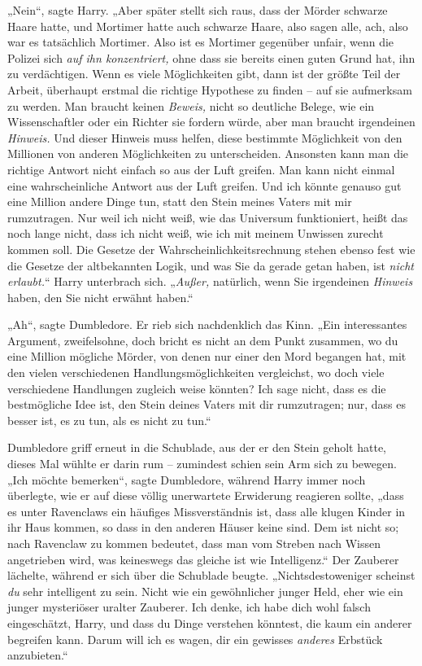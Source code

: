 {„Nein“, sagte Harry. „Aber später stellt sich raus, dass der Mörder schwarze Haare hatte, und Mortimer hatte auch schwarze Haare, also sagen alle, ach, also war es tatsächlich Mortimer. Also ist es Mortimer gegenüber unfair, wenn die Polizei sich \emph{auf ihn konzentriert,} ohne dass sie bereits einen guten Grund hat, ihn zu verdächtigen. Wenn es viele Möglichkeiten gibt, dann ist der größte Teil der Arbeit, überhaupt erstmal die richtige Hypothese zu finden -- auf sie aufmerksam zu werden. Man braucht keinen \emph{Beweis,} nicht so deutliche Belege, wie ein Wissenschaftler oder ein Richter sie fordern würde, aber man braucht irgendeinen \emph{Hinweis.} Und dieser Hinweis muss helfen, diese bestimmte Möglichkeit von den Millionen von anderen Möglichkeiten zu unterscheiden. Ansonsten kann man die richtige Antwort nicht einfach so aus der Luft greifen. Man kann nicht einmal eine wahrscheinliche Antwort aus der Luft greifen. Und ich könnte genauso gut eine Million andere Dinge tun, statt den Stein meines Vaters mit mir rumzutragen. Nur weil ich nicht weiß, wie das Universum funktioniert, heißt das noch lange nicht, dass ich nicht weiß, wie ich mit meinem Unwissen zurecht kommen soll. Die Gesetze der Wahrscheinlichkeitsrechnung stehen ebenso fest wie die Gesetze der altbekannten Logik, und was Sie da gerade getan haben, ist \emph{nicht erlaubt.}“ Harry unterbrach sich. „\emph{Außer,} natürlich, wenn Sie irgendeinen \emph{Hinweis} haben, den Sie nicht erwähnt haben.“

„Ah“, sagte Dumbledore. Er rieb sich nachdenklich das Kinn. „Ein interessantes Argument, zweifelsohne, doch bricht es nicht an dem Punkt zusammen, wo du eine Million mögliche Mörder, von denen nur einer den Mord begangen hat, mit den vielen verschiedenen Handlungsmöglichkeiten vergleichst, wo doch viele verschiedene Handlungen zugleich weise könnten? Ich sage nicht, dass es die bestmögliche Idee ist, den Stein deines Vaters mit dir rumzutragen; nur, dass es besser ist, es zu tun, als es nicht zu tun.“

Dumbledore griff erneut in die Schublade, aus der er den Stein geholt hatte, dieses Mal wühlte er darin rum -- zumindest schien sein Arm sich zu bewegen. „Ich möchte bemerken“, sagte Dumbledore, während Harry immer noch überlegte, wie er auf diese völlig unerwartete Erwiderung reagieren sollte, „dass es unter Ravenclaws ein häufiges Missverständnis ist, dass alle klugen Kinder in ihr Haus kommen, so dass in den anderen Häuser keine sind. Dem ist nicht so; nach Ravenclaw zu kommen bedeutet, dass man vom Streben nach Wissen angetrieben wird, was keineswegs das gleiche ist wie Intelligenz.“ Der Zauberer lächelte, während er sich über die Schublade beugte. „Nichtsdestoweniger scheinst \emph{du} sehr intelligent zu sein. Nicht wie ein gewöhnlicher junger Held, eher wie ein junger mysteriöser uralter Zauberer. Ich denke, ich habe dich wohl falsch eingeschätzt, Harry, und dass du Dinge verstehen könntest, die kaum ein anderer begreifen kann. Darum will ich es wagen, dir ein gewisses \emph{anderes} Erbstück anzubieten.“

}

